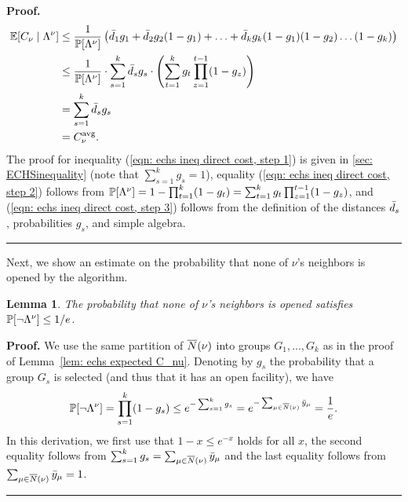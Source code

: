 \documentclass[oneside,final]{ucr}
\newtheorem{lemma}[theorem]{Lemma}
\newenvironment{proof}[1][Proof]{\textbf{#1.} }{\ \rule{0.5em}{0.5em}}
\def\dsp{\def\baselinestretch{2.0}\large\normalsize}
\def\ssp{\def\baselinestretch{1.0}\large\normalsize}
\begin{document}
\begin{proof}
\ssp
\begin{align}
  \mathbb{E}[C_\nu \mid \Lambda^\nu] &\leq \frac{1}{\mathbb{P}[\Lambda^\nu]}
  \left( {\bar d}_1 g_1 + {\bar d}_2 g_2 (1-g_1) + \ldots + {\bar d}_k g_k
    (1-g_1) (1-g_2) \ldots (1-g_k) \right)
			\notag
  \\
  &\leq \frac{1}{\mathbb{P}[\Lambda^\nu]}
	\cdot \sum_{s=1}^k {\bar d}_s g_s
	\cdot
		\left(\sum_{t=1}^k g_t \prod_{z=1}^{t-1} (1-g_z)\right)
			\label{eqn: echs ineq direct cost, step 1}
  \\
  &= \sum_{s=1}^k {\bar d}_s g_s
			\label{eqn: echs ineq direct cost, step 2}
	\\
			&= C^{{\mbox{\scriptsize\rm avg}}}_{\nu}.
				\label{eqn: echs ineq direct cost, step 3}
\end{align}
\dsp
The proof for inequality (\ref{eqn: echs ineq direct cost, step 1}) 
is given in \ref{sec: ECHSinequality} (note that $\sum_{s=1}^k g_s = 1$),
equality (\ref{eqn: echs ineq direct cost, step 2}) follows from
$\mathbb{P}[\Lambda^\nu] = 1 - \prod_{t=1}^k (1-g_t)
					= \sum_{t=1}^k g_t
                                        \prod_{z=1}^{t-1} (1 - g_z)$,
and (\ref{eqn: echs ineq direct cost, step 3}) follows from the definition
of the distances ${\bar d}_s$, probabilities $g_s$, and simple algebra.
\end{proof}

Next, we show an estimate on the probability that none of $\nu$'s
neighbors is opened by the algorithm.

\begin{lemma}\label{lem: probability of not Lambda^nu}
The probability that none of $\nu$'s neighbors is opened satisfies
$\mathbb{P}[\neg\Lambda^\nu] \le 1/e$.
\end{lemma}
\begin{proof}
We use the same partition of ${\overline{N}}(\nu)$ into groups $G_1,...,G_k$ as
in the proof of Lemma~\ref{lem: echs expected C_nu}. Denoting by
$g_s$ the probability that a group $G_s$ is selected (and thus that it
has an open facility), we have
%
\begin{equation*}
\mathbb{P}[\neg\Lambda^\nu] = \prod_{s=1}^k (1 - g_s)
			\le e^{- \sum_{s=1}^k g_s}
			= e^{-\sum_{\mu \in {\overline{N}}(\nu)} {\bar y}_{\mu}}
			= \frac{1}{e}.
\end{equation*}
%
In this derivation, we first use that $1-x\le e^{-x}$ holds for all $x$,
the second equality follows from $\sum_{s=1}^k g_s = \sum_{\mu \in {\overline{N}}(\nu)} {\bar y}_{\mu}$
and the last equality follows from 
$\sum_{\mu \in {\overline{N}}(\nu)} {\bar y}_{\mu} = 1$.
\end{proof}
\end{document}
